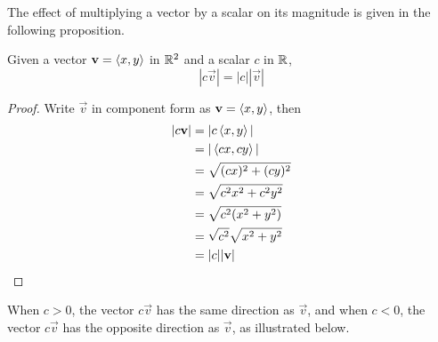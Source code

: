 \documentclass[handout]{ximera}
\begin{document}
The effect of multiplying a vector by a scalar on its magnitude is given in the following proposition.
\begin{proposition}[Scaling]
Given a vector $\mathbf{v} = \left\langle x,y\right\rangle$ in $\mathbb R^2$ and a scalar $c$ in $\mathbb R$,
\[
|c\vec{v}| = |c| |\vec{v}|
\]
\begin{proof}
Write $\vec{v}$ in component form as $\mathbf{v} = \left\langle x,y\right\rangle$, then
\begin{align*}
|c\mathbf{v}| &= |c\left\langle x,y\right\rangle|\\
            &= |\left\langle cx,cy\right\rangle|\\
            &= \sqrt{(cx)^2 + (cy)^2}\\
            &= \sqrt{c^2x^2 + c^2y^2}\\
            &= \sqrt{c^2(x^2 + y^2)}\\
            &= \sqrt{c^2} \sqrt{x^2 + y^2}\\
            &= |c| |\mathbf{v}|
\end{align*}
\end{proof}
\end{proposition}

When $c>0$, the vector $c\vec{v}$ has the same direction as $\vec{v}$, and when $c<0$, the
vector $c\vec{v}$ has the opposite direction as $\vec{v}$, as illustrated below.



\begin{image}
\end{image}
\end{document}
